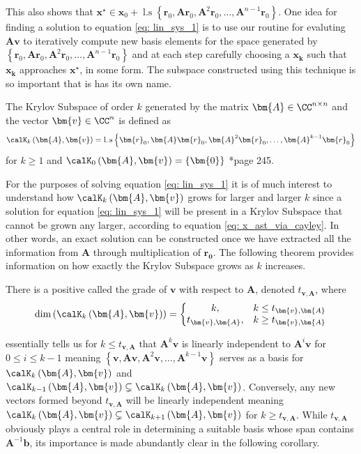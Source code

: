This also shows that $\bm{x^{\star}} \in \bm{x}_0 + \operatorname{l.s} \left\{ \bm{r}_0, \bm{A} \bm{r}_0, \bm{A}^2 \bm{r}_0, \ldots , \bm{A}^{n-1} \bm{r}_0 \right\}$. One idea for finding a solution to equation \ref{eq: lin_sys_1} is to use our routine for evaluting $\bm{A} \bm{v}$ to iteratively compute new basis elements for the space generated by $\left\{ \bm{r}_0, \bm{A} \bm{r}_0, \bm{A}^2 \bm{r}_0, \ldots , \bm{A}^{n-1} \bm{r}_0 \right\}$ and at each step carefully choosing a $\bm{x_k}$ such that $\bm{x_k}$ approaches $\bm{x^{\star}}$, in some form. The subspace constructed using this technique is so important that is has its own name.
\begin{defe} \label{defe: krylov_subspace}
    The Krylov Subspace of order $k$ generated by the matrix $\bm{A} \in \CC^{n \times n}$ and the vector $\bm{v} \in \CC^{n}$ is defined as
    \[
        \calK_{k} \left( \bm{A},\bm{v} \right) = \operatorname{l.s} \left\{ \bm{r}_0, \bm{A} \bm{r}_0, \bm{A}^2 \bm{r}_0, \ldots , \bm{A}^{k-1} \bm{r}_0 \right\}
    \]
    for $k \geq 1$ and $\calK_{0} \left( \bm{A},\bm{v} \right) = \left\{ \bm{0} \right\}$ \cite{TrefethenLloydN.LloydNicholas1997Nla/}*{page 245}.
\end{defe}
For the purposes of solving equation \ref{eq: lin_sys_1} it is of much interest to understand how $\calK_{k} \left( \bm{A},\bm{v} \right)$ grows for larger and larger $k$ since a solution for equation \ref{eq: lin_sys_1} will be present in a Krylov Subspace that cannot be grown any larger, according to equation \ref{eq: x_ast_via_cayley}. In other words, an exact solution can be constructed once we have extracted all the information from $\bm{A}$ through multiplication of $\bm{r_0}$. The following theorem provides information on how exactly the Krylov Subspace grows as $k$ increases.
\begin{thm} \label{theorem: grade_of_v}
    There is a positive called the grade of $\bm{v}$ with respect to $\bm{A}$, denoted $t_{\bm{v}, \bm{A}}$, where
    \[
        \operatorname{dim} \left( \calK_{k} \left( \bm{A} , \bm{v} \right) \right) = \left\{
        \begin{matrix}
            k,                  & k \leq t_{\bm{v}, \bm{A}} \\
            t_{\bm{v}, \bm{A}}, & k \geq t_{\bm{v}, \bm{A}}
        \end{matrix}
        \right.
    \]
\end{thm}
 essentially tells us for $k \leq t_{\bm{v}, \bm{A}}$ that $\bm{A}^k \bm{v}$ is linearly independent to $\bm{A}^i \bm{v}$ for $0 \leq i \leq k-1$ meaning $\left\{ \bm{v}, \bm{A} \bm{v}, \bm{A}^2 \bm{v}, \ldots , \bm{A}^{k-1} \bm{v} \right\}$ serves as a basis for $\calK_{k} \left( \bm{A},\bm{v} \right)$ and $\calK_{k-1} \left( \bm{A},\bm{v} \right) \subsetneq \calK_{k} \left( \bm{A},\bm{v} \right)$. Conversely, any new vectors formed beyond $t_{\bm{v}, \bm{A}}$ will be linearly independent meaning $\calK_{k} \left( \bm{A},\bm{v} \right) \subsetneq \calK_{k+1} \left( \bm{A},\bm{v} \right)$ for $k \geq t_{\bm{v}, \bm{A}}$. While $t_{\bm{v}, \bm{A}}$ obviously plays a central role in determining a suitable basis whose span contains $\bm{A}^{-1} \bm{b}$, its importance is made abundantly clear in the following corollary.
